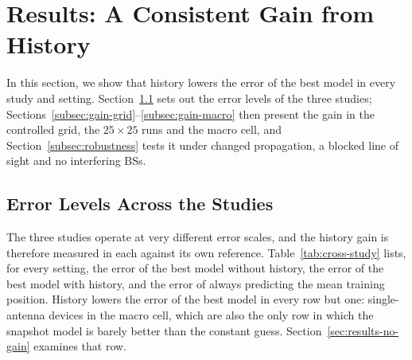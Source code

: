 \section{Results: A Consistent Gain from History}
\label{sec:results-gain}

In this section, we show that history lowers the error of the best model in every study and setting. Section~\ref{subsec:error-levels} sets out the error levels of the three studies; Sections~\ref{subsec:gain-grid}--\ref{subsec:gain-macro} then present the gain in the controlled grid, the $25\times25$ runs and the macro cell, and Section~\ref{subsec:robustness} tests it under changed propagation, a blocked line of sight and no interfering BSs.

\subsection{Error Levels Across the Studies}
\label{subsec:error-levels}

The three studies operate at very different error scales, and the history gain is therefore measured in each against its own reference. Table~\ref{tab:cross-study} lists, for every setting, the error of the best model without history, the error of the best model with history, and the error of always predicting the mean training position. History lowers the error of the best model in every row but one: single-antenna devices in the macro cell, which are also the only row in which the snapshot model is barely better than the constant guess. Section~\ref{sec:results-no-gain} examines that row.

